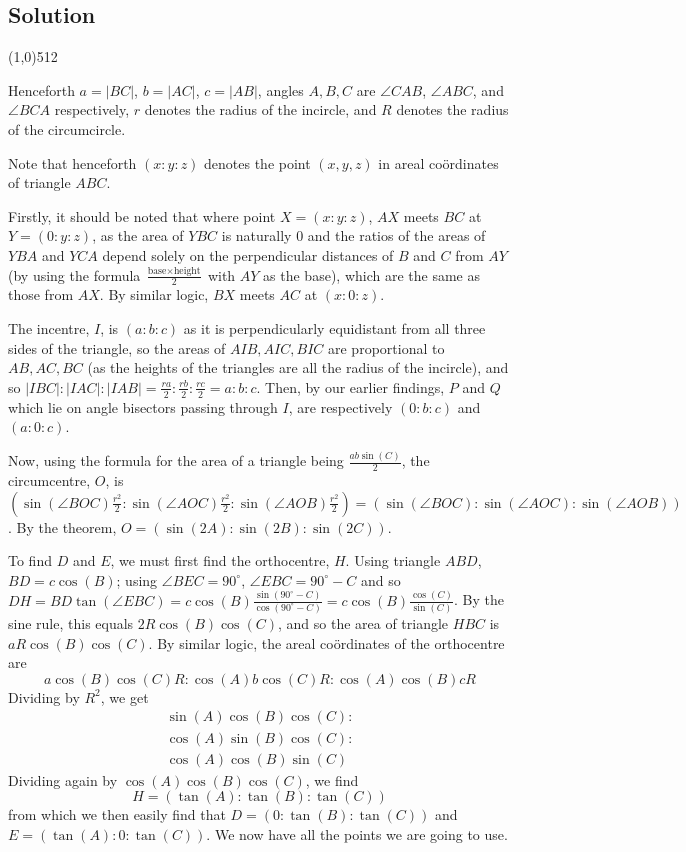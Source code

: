 \documentclass[11pt,a4paper]{report}
\let\origsection\subsection
\renewcommand{\subsection}[1]{\origsection{#1}\vspace{-0.5em}\line(1,0){512}\vspace{-1em}}
\begin{document}
	\subsection{Solution}
	
	\begin{multicols}{2}
		
		Henceforth \(a=|BC|\), \(b=|AC|\), \(c=|AB|\), angles \(A,B,C\) are \(\angle{}CAB\), \(\angle{}ABC\), and \(\angle{}BCA\) respectively, \(r\) denotes the radius of the incircle, and \(R\) denotes the radius of the circumcircle.
		
		Note that henceforth \((x:y:z)\) denotes the point \((x,y,z)\) in areal coördinates of triangle \(ABC\).
		
		Firstly, it should be noted that where point \(X=(x:y:z)\), \(AX\) meets \(BC\) at \(Y=(0:y:z)\), as the area of \(YBC\) is naturally 0 and the ratios of the areas of \(YBA\) and \(YCA\) depend solely on the perpendicular distances of \(B\) and \(C\) from \(AY\) (by using the formula \(\frac{\textrm{base}\times{}\textrm{height}}{2}\) with \(AY\) as the base), which are the same as those from \(AX\). By similar logic, \(BX\) meets \(AC\) at \((x:0:z)\).
		
		The incentre, \(I\), is \((a:b:c)\) as it is perpendicularly equidistant from all three sides of the triangle, so the areas of \(AIB, AIC, BIC\) are proportional to \(AB, AC, BC\) (as the heights of the triangles are all the radius of the incircle), and so \(|IBC|:|IAC|:|IAB|=\frac{ra}{2}:\frac{rb}{2}:\frac{rc}{2}=a:b:c\). Then, by our earlier findings, \(P\) and \(Q\) which lie on angle bisectors passing through \(I\), are respectively \((0:b:c)\) and \((a:0:c)\).
		
		Now, using the formula for the area of a triangle being \(\frac{ab\sin(C)}{2}\), the circumcentre, \(O\), is \((\sin(\angle{}BOC)\frac{r^2}{2}:\sin(\angle{}AOC)\frac{r^2}{2}:\sin(\angle{}AOB)\frac{r^2}{2})=(\sin(\angle{}BOC):\sin(\angle{}AOC):\sin(\angle{}AOB))\). By the  theorem, \(O=(\sin(2A):\sin(2B):\sin(2C))\).
		
		To find \(D\) and \(E\), we must first find the orthocentre, \(H\). Using triangle \(ABD\), \(BD=c\cos(B)\); using \(\angle{}BEC=90^{\circ}\), \(\angle{}EBC=90^{\circ}-C\) and so \(DH=BD\tan(\angle{}EBC)=c\cos(B)\frac{\sin(90^{\circ}-C)}{\cos(90^{\circ}-C)}=c\cos(B)\frac{\cos(C)}{\sin(C)}\). By the sine rule, this equals \(2R\cos(B)\cos(C)\), and so the area of triangle \(HBC\) is \(aR\cos(B)\cos(C)\). By similar logic, the areal coördinates of the orthocentre are
		\[a\cos(B)\cos(C)R:\cos(A)b\cos(C)R:\cos(A)\cos(B)cR\]
		Dividing by \(R^2\), we get
		\[\begin{split}
		\sin(A)\cos(B)\cos(C):\\
		\cos(A)\sin(B)\cos(C):\\
		\cos(A)\cos(B)\sin(C)
		\end{split}\]
		Dividing again by \(\cos(A)\cos(B)\cos(C)\), we find
		\[H=(\tan(A):\tan(B):\tan(C))\]
		from which we then easily find that \(D=(0:\tan(B):\tan(C))\) and \(E=(\tan(A):0:\tan(C))\). We now have all the points we are going to use.
		

\end{multicols}
\end{document}
